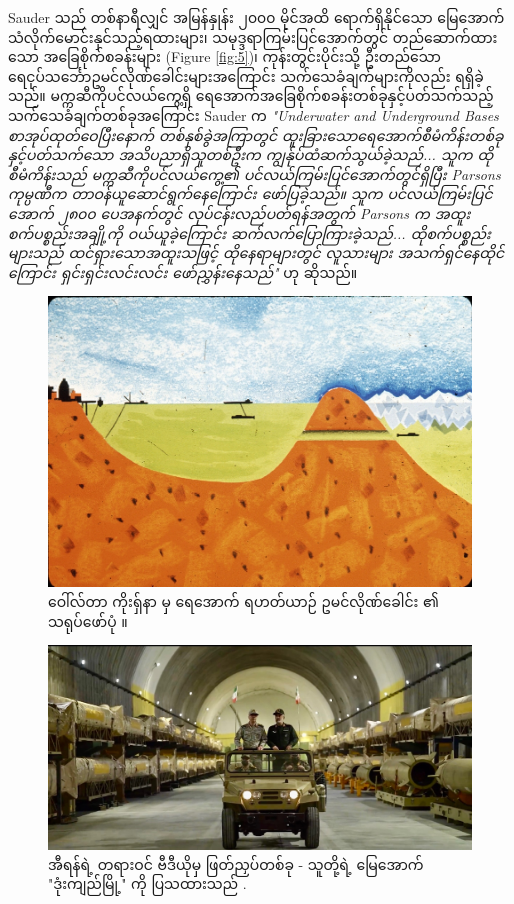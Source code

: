 \documentclass[10pt,twocolumn,letterpaper]{article}
\begin{document}
Sauder သည် တစ်နာရီလျှင် အမြန်နှုန်း ၂၀၀၀ မိုင်အထိ ရောက်ရှိနိုင်သော မြေအောက်သံလိုက်မောင်းနှင်သည့်ရထားများ၊ သမုဒ္ဒရာကြမ်းပြင်အောက်တွင် တည်ဆောက်ထားသော အခြေစိုက်စခန်းများ (Figure \ref{fig:5})၊ ကုန်းတွင်းပိုင်းသို့ ဦးတည်သော ရေငုပ်သင်္ဘောဥမင်လိုဏ်ခေါင်းများအကြောင်း သက်သေခံချက်များကိုလည်း ရရှိခဲ့သည်။ မက္ကဆီကိုပင်လယ်ကွေ့ရှိ ရေအောက်အခြေစိုက်စခန်းတစ်ခုနှင့်ပတ်သက်သည့် သက်သေခံချက်တစ်ခုအကြောင်း Sauder က \textit{"Underwater and Underground Bases စာအုပ်ထုတ်ဝေပြီးနောက် တစ်နှစ်ခွဲအကြာတွင် ထူးခြားသောရေအောက်စီမံကိန်းတစ်ခုနှင့်ပတ်သက်သော အသိပညာရှိသူတစ်ဦးက ကျွန်ုပ်ထံဆက်သွယ်ခဲ့သည်... သူက ထိုစီမံကိန်းသည် မက္ကဆီကိုပင်လယ်ကွေ့၏ ပင်လယ်ကြမ်းပြင်အောက်တွင်ရှိပြီး Parsons ကုမ္ပဏီက တာဝန်ယူဆောင်ရွက်နေကြောင်း ဖော်ပြခဲ့သည်။ သူက ပင်လယ်ကြမ်းပြင်အောက် ၂၈၀၀ ပေအနက်တွင် လုပ်ငန်းလည်ပတ်ရန်အတွက် Parsons က အထူးစက်ပစ္စည်းအချို့ကို ဝယ်ယူခဲ့ကြောင်း ဆက်လက်ပြောကြားခဲ့သည်... ထိုစက်ပစ္စည်းများသည် ထင်ရှားသောအထူးသဖြင့် ထိုနေရာများတွင် လူသားများ အသက်ရှင်နေထိုင်ကြောင်း ရှင်းရှင်းလင်းလင်း ဖော်ညွှန်းနေသည်"} \cite{22} ဟု ဆိုသည်။
\begin{figure}[t]
\begin{center}
   \includegraphics[width=1\linewidth]{sub.jpg}
\end{center}
   \caption{ဝေါ်လ်တာ ကိုးရှ်နာ မှ ရေအောက် ရဟတ်ယာဉ် ဥမင်လိုဏ်ခေါင်း ၏ သရုပ်ဖော်ပုံ \cite{22,23}။}
\label{fig:6}
\label{fig:onecol}
\end{figure}
\begin{figure}[t]
\begin{center}
   \includegraphics[width=1\linewidth]{iran.jpeg}
\end{center}
   \caption{အီရန်ရဲ့ တရားဝင် ဗီဒီယိုမှ ဖြတ်ညှပ်တစ်ခု - သူတို့ရဲ့ မြေအောက် "ဒုံးကျည်မြို့" ကို ပြသထားသည် \cite{39,40}.}
\label{fig:12}
\label{fig:onecol}
\end{figure}
\end{document}
